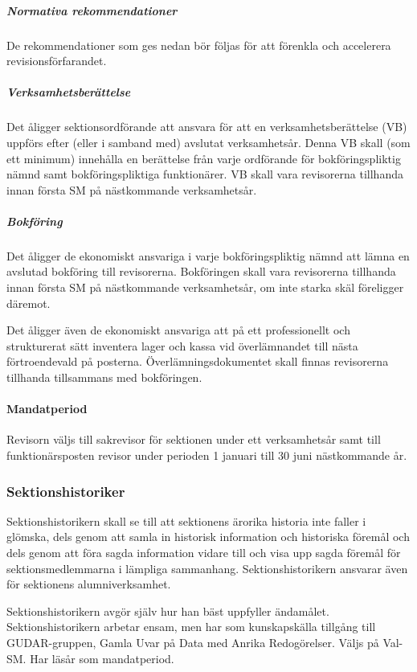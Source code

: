 \documentclass[a4paper,12pt]{article}
\begin{document}
\subparagraph{Normativa rekommendationer}

De rekommendationer som ges nedan bör följas för att förenkla och accelerera revisionsförfarandet.

\subparagraph{Verksamhetsberättelse}

Det åligger sektionsordförande att ansvara för att en verksamhetsberättelse (VB) uppförs efter (eller i samband med) avslutat verksamhetsår. Denna VB skall (som ett minimum) innehålla en berättelse från varje ordförande för bokföringspliktig nämnd samt bokföringspliktiga funktionärer. VB skall vara revisorerna tillhanda innan första SM på nästkommande verksamhetsår.

\subparagraph{Bokföring}

Det åligger de ekonomiskt ansvariga i varje bokföringspliktig nämnd att lämna en avslutad bokföring till revisorerna. Bokföringen skall vara revisorerna tillhanda innan första SM på nästkommande verksamhetsår, om inte starka skäl föreligger däremot.

Det åligger även de ekonomiskt ansvariga att på ett professionellt och strukturerat sätt inventera lager och kassa vid överlämnandet till nästa förtroendevald på posterna. Överlämningsdokumentet skall finnas revisorerna tillhanda tillsammans med bokföringen.

\paragraph{Mandatperiod}

Revisorn väljs till sakrevisor för sektionen under ett verksamhetsår samt till funktionärsposten revisor under perioden 1 januari till 30 juni nästkommande år.

\subsubsection{Sektionshistoriker}

Sektionshistorikern skall se till att sektionens ärorika historia inte faller i
glömska, dels genom att samla in historisk information och historiska föremål och dels genom att föra sagda information vidare till och visa upp sagda föremål för sektionsmedlemmarna i lämpliga sammanhang. Sektionshistorikern ansvarar även för sektionens alumniverksamhet.

Sektionshistorikern avgör själv hur han bäst uppfyller ändamålet. Sektionshistorikern arbetar ensam, men har som kunskapskälla tillgång till GUDAR-gruppen, Gamla Uvar på Data med Anrika Redogörelser. Väljs på Val-SM. Har läsår som mandatperiod.
\end{document}
